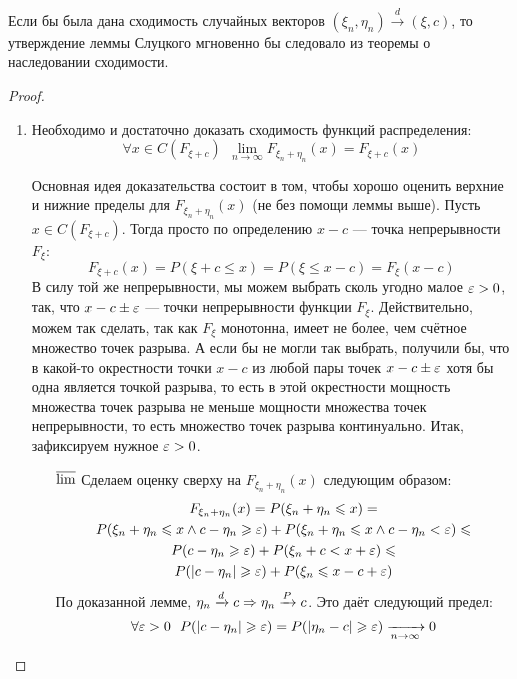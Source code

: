 \begin{note}
    Если бы была дана сходимость случайных векторов $(\xi_n, \eta_n) \xrightarrow{d} (\xi, c)$, то утверждение леммы Слуцкого мгновенно бы следовало из теоремы о наследовании сходимости.
\end{note}

\begin{proof}~
    \begin{enumerate}
        \item Необходимо и достаточно доказать сходимость функций распределения:
        \[
        	\forall x \in C(F_{\xi + c})\ \ \lim_{n \to \infty} F_{\xi_n + \eta_n}(x) = F_{\xi + c}(x)
        \]

		Основная идея доказательства состоит в том, чтобы хорошо оценить верхние и нижние пределы для $F_{\xi_n + \eta_n}(x)$ (не без помощи леммы выше). Пусть $x \in C(F_{\xi + c})$. Тогда просто по определению $x - c$ --- точка непрерывности $F_{\xi}$:
		\[
			F_{\xi + c}(x) = P(\xi + c \le x) = P(\xi \le x - c) = F_\xi(x - c)
		\]
		В силу той же непрерывности, мы можем выбрать сколь угодно малое $\varepsilon > 0$, так, что $x - c \pm \varepsilon$ --- точки непрерывности функции $F_\xi$. Действительно, можем так сделать, так как $F_\xi$ монотонна, имеет не более, чем счётное множество точек разрыва. А если бы не могли так выбрать, получили бы, что в какой-то окрестности точки $x - c$ из любой пары точек $x - c \pm \varepsilon$ хотя бы одна является точкой разрыва, то есть в этой окрестности мощность множества точек разрыва не меньше мощности множества точек непрерывности, то есть множество точек разрыва континуально. Итак, зафиксируем нужное $\varepsilon > 0$.
		\begin{itemize}
			\item[$\varlimsup$] Сделаем оценку сверху на $F_{\xi_n + \eta_n}(x)$ следующим образом:
			\begin{multline*}
				F_{\xi_n + \eta_n}(x) = P(\xi_n + \eta_n \leqslant x) =
				\\
				P(\xi_n + \eta_n \leqslant x \wedge c - \eta_n \geqslant \varepsilon) + P(\xi_n + \eta_n \leqslant x \wedge c - \eta_n < \varepsilon) \leqslant
				\\
				P(c - \eta_n \geqslant \varepsilon) + P(\xi_n + c < x + \varepsilon) \leqslant
				\\
				P(|c - \eta_n| \geqslant \varepsilon) + P(\xi_n \leqslant x - c + \varepsilon)
			\end{multline*}
			По доказанной лемме, $\eta_n \xrightarrow{d} c \Rightarrow \eta_n \xrightarrow{P} c$. Это даёт следующий предел:
			\[
				\forall \varepsilon > 0\ \ P(|c - \eta_n| \geqslant \varepsilon) = P(|\eta_n - c| \geqslant \varepsilon) \xrightarrow[n \to \infty]{} 0
\]
\end{itemize}
\end{enumerate}
\end{proof}
